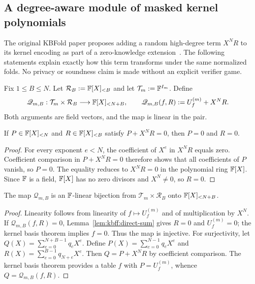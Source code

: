 \subsection{A degree-aware module of masked kernel polynomials}\label{sec:kbfoldfold:masked}

The original KBFold paper proposes adding a random high-degree term $X^NR$ to its kernel encoding as part of a zero-knowledge extension~\cite{MkhidaKBFold2026}. The following statements explain exactly how this term transforms under the same normalized folds. No privacy or soundness claim is made without an explicit verifier game.

\begin{definition}\label{def:kbff:mask-encoding}
Fix $1\leq B\leq N$. Let $\mathcal R_B:=\mathbb{F}[X]_{<B}$ and let $\mathcal T_m:=\mathbb{F}^{I_m}$. Define
\[
 \mathscr Q_{m,B}:\mathcal T_m\times\mathcal R_B\longrightarrow
   \mathbb{F}[X]_{<N+B},\qquad
 \mathscr Q_{m,B}(f,R):=U_f^{(m)}+X^NR.
\]
Both arguments are field vectors, and the map is linear in the pair.
\end{definition}

\begin{lemma}\label{lem:kbff:direct-sum}
If $P\in\mathbb{F}[X]_{<N}$ and $R\in\mathbb{F}[X]_{<B}$ satisfy
$P+X^NR=0$, then $P=0$ and $R=0$.
\end{lemma}
\begin{proof}
For every exponent $e<N$, the coefficient of $X^e$ in $X^NR$ equals zero. Coefficient comparison in $P+X^NR=0$ therefore shows that all coefficients of $P$ vanish, so $P=0$. The equality reduces to $X^NR=0$ in the polynomial ring $\mathbb{F}[X]$. Since $\mathbb{F}$ is a field, $\mathbb{F}[X]$ has no zero divisors and $X^N\neq0$, so $R=0$.
\end{proof}

\begin{proposition}\label{prop:kbff:extended-iso}
The map $\mathscr Q_{m,B}$ is an $\mathbb{F}$-linear bijection from
$\mathcal T_m\times\mathcal R_B$ onto $\mathbb{F}[X]_{<N+B}$.
\end{proposition}
\begin{proof}
Linearity follows from linearity of $f\mapsto U_f^{(m)}$ and of multiplication by $X^N$. If $\mathscr Q_{m,B}(f,R)=0$, Lemma~\ref{lem:kbff:direct-sum} gives $R=0$ and $U_f^{(m)}=0$; the kernel basis theorem implies $f=0$. Thus the map is injective. For surjectivity, let
$Q(X)=\sum_{e=0}^{N+B-1}q_eX^e$. Define
$P(X)=\sum_{e=0}^{N-1}q_eX^e$ and
$R(X)=\sum_{e=0}^{B-1}q_{N+e}X^e$. Then
$Q=P+X^NR$ by coefficient comparison. The kernel basis theorem provides a table $f$ with $P=U_f^{(m)}$, whence
$Q=\mathscr Q_{m,B}(f,R)$.
\end{proof}

